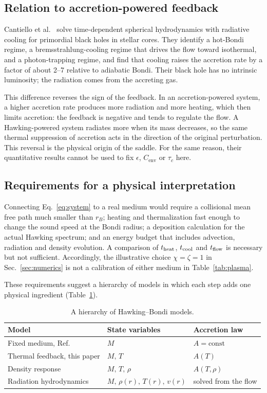 \documentclass[11pt,a4paper]{article}
\newcommand{\Cenv}{C_{\mathrm{env}}}
\begin{document}
\subsection{Relation to accretion-powered feedback}
Cantiello et al.~\cite{cantiello} solve time-dependent spherical hydrodynamics with radiative cooling for primordial black holes in stellar cores. They identify a hot-Bondi regime, a bremsstrahlung-cooling regime that drives the flow toward isothermal, and a photon-trapping regime, and find that cooling raises the accretion rate by a factor of about 2--7 relative to adiabatic Bondi. Their black hole has no intrinsic luminosity; the radiation comes from the accreting gas.

This difference reverses the sign of the feedback. In an accretion-powered system, a higher accretion rate produces more radiation and more heating, which then limits accretion: the feedback is negative and tends to regulate the flow. A Hawking-powered system radiates more when its mass decreases, so the same thermal suppression of accretion acts in the direction of the original perturbation. This reversal is the physical origin of the saddle. For the same reason, their quantitative results cannot be used to fix $\epsilon$, $\Cenv$ or $\tau_c$ here.

\subsection{Requirements for a physical interpretation}
Connecting Eq.~\eqref{eq:system} to a real medium would require a collisional mean free path much smaller than $r_B$; heating and thermalization fast enough to change the sound speed at the Bondi radius; a deposition calculation for the actual Hawking spectrum; and an energy budget that includes advection, radiation and density evolution. A comparison of $t_{\rm heat}$, $t_{\rm cool}$ and $t_{\rm flow}$ is necessary but not sufficient. Accordingly, the illustrative choice $\chi=\zeta=1$ in Sec.~\ref{sec:numerics} is not a calibration of either medium in Table~\ref{tab:plasma}.

These requirements suggest a hierarchy of models in which each step adds one physical ingredient (Table~\ref{tab:hierarchy}).

\begin{table}[tbp]
\centering\small
\caption{A hierarchy of Hawking--Bondi models.}
\label{tab:hierarchy}
\begin{tabular}{@{}lll@{}}
\toprule
Model & State variables & Accretion law\\
\midrule
Fixed medium, Ref.~\cite{paperI} & $M$ & $A=\text{const}$\\
Thermal feedback, this paper & $M,\,T$ & $A(T)$\\
Density response & $M,\,T,\,\rho$ & $A(T,\rho)$\\
Radiation hydrodynamics & $M,\,\rho(r),\,T(r),\,v(r)$ & solved from the flow\\
\bottomrule
\end{tabular}
\end{table}
\end{document}
